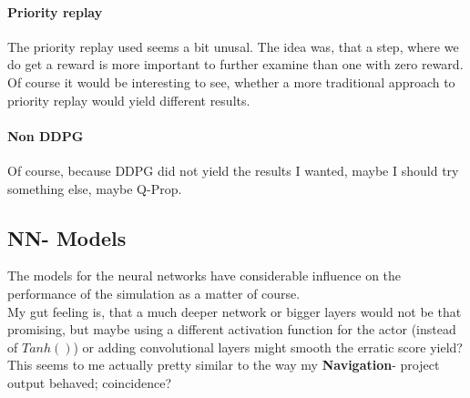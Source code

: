 \documentclass[a4paper]{article}
\begin{document}
\paragraph{Priority replay}
The priority replay used seems a bit unusal. The idea was, that a step, where
we do get a reward is more important to further examine than one with zero
reward.
\\
Of course it would be interesting to see, whether a more traditional approach
to priority replay would yield different results.

\paragraph{Non DDPG}
Of course, because DDPG did not yield the results I wanted, maybe I should
try something else, maybe Q-Prop.

\subsection{NN- Models}
The models for the neural networks have considerable influence on the
performance of the simulation as a matter of course.
\\
My gut feeling is, that a much deeper network or bigger layers
would not be that promising, but maybe using a different activation function
for the actor (instead of $Tanh()$) or adding convolutional layers might smooth
the erratic score yield? This seems to me actually pretty similar to the
way my \textbf{Navigation}- project output behaved; coincidence?
\end{document}
